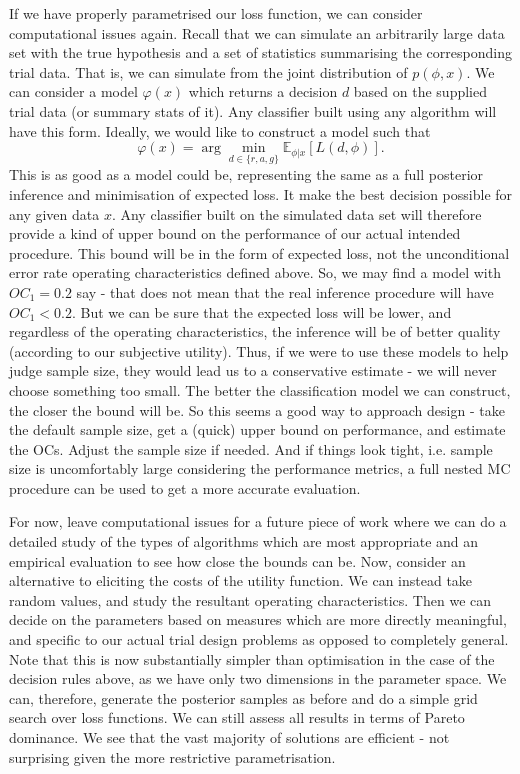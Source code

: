 \documentclass{article} %
\begin{document}
If we have properly parametrised our loss function, we can consider computational issues again. Recall that we can simulate an arbitrarily large data set with the true hypothesis and a set of statistics summarising the corresponding trial data. That is, we can simulate from the joint distribution of $p(\phi, x)$. We can consider a model $\varphi(x)$ which returns a decision $d$ based on the supplied trial data (or summary stats of it). Any classifier built using any algorithm will have this form. Ideally, we would like to construct a model such that
\begin{equation}
\varphi(x) = \arg\min_{d \in \{r,a,g\}} \mathbb{E}_{\phi | x} [ L(d, \phi) ].
\end{equation}
This is as good as a model could be, representing the same as a full posterior inference and minimisation of expected loss. It make the best decision possible for any given data $x$. Any classifier built on the simulated data set will therefore provide a kind of upper bound on the performance of our actual intended procedure. This bound will be in the form of expected loss, not the unconditional error rate operating characteristics defined above. So, we may find a model with $OC_{1} = 0.2$ say - that does not mean that the real inference procedure will have $OC_{1} < 0.2$. But we can be sure that the expected loss will be lower, and regardless of the operating characteristics, the inference will be of better quality (according to our subjective utility). Thus, if we were to use these models to help judge sample size, they would lead us to a conservative estimate - we will never choose something too small. The better the classification model we can construct, the closer the bound will be. So this seems a good way to approach design - take the default sample size, get a (quick) upper bound on performance, and estimate the OCs. Adjust the sample size if needed. And if things look tight, i.e. sample size is uncomfortably large considering the performance metrics, a full nested MC procedure can be used to get a more accurate evaluation.

For now, leave computational issues for a future piece of work where we can do a detailed study of the types of algorithms which are most appropriate and an empirical evaluation to see how close the bounds can be. Now, consider an alternative to eliciting the costs of the utility function. We can instead take random values, and study the resultant operating characteristics. Then we can decide on the parameters based on measures which are more directly meaningful, and specific to our actual trial design problems as opposed to completely general. Note that this is now substantially simpler than optimisation in the case of the decision rules above, as we have only two dimensions in the parameter space. We can, therefore, generate the posterior samples as before and do a simple grid search over loss functions. We can still assess all results in terms of Pareto dominance. We see that the vast majority of solutions are efficient - not surprising given the more restrictive parametrisation. 
\end{document}
